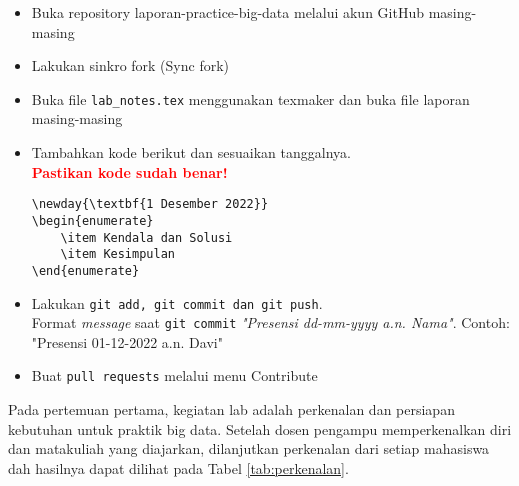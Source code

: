 \documentclass[a4paper]{tufte-handout}
\begin{document}
\begin{maybe}
\begin{itemize}
\begin{itemize}
\item Buka repository laporan-practice-big-data melalui akun GitHub masing-masing
\item Lakukan sinkro fork (Sync fork)
\item Buka file {\tt lab\_notes.tex} menggunakan texmaker dan buka file laporan masing-masing
\item Tambahkan kode berikut dan sesuaikan tanggalnya. \\
\textbf{\textcolor{red}{Pastikan kode sudah benar!}}
\begin{lstlisting}
\newday{\textbf{1 Desember 2022}}
\begin{enumerate}
	\item Kendala dan Solusi
	\item Kesimpulan
\end{enumerate}
\end{lstlisting}
\item Lakukan {\tt git add, git commit dan git push}. \\ 
Format \textit{message} saat {\tt git commit} \textit{"Presensi dd-mm-yyyy a.n. Nama"}. Contoh: "Presensi 01-12-2022 a.n. Davi"
\item Buat {\tt pull requests} melalui menu Contribute
\end{itemize}
\end{itemize}
\end{maybe}

\clearpage
{}


Pada pertemuan pertama, kegiatan lab adalah perkenalan dan persiapan kebutuhan untuk praktik big data. Setelah dosen pengampu memperkenalkan diri dan matakuliah yang diajarkan, dilanjutkan perkenalan dari setiap mahasiswa dah hasilnya dapat dilihat pada Tabel \ref{tab:perkenalan}.
\end{document}
